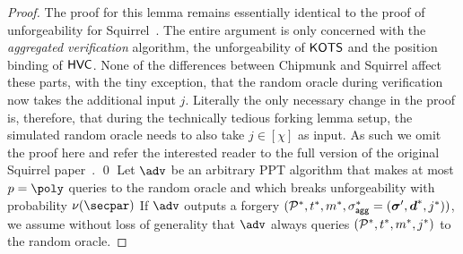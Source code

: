 \begin{proof}
  The proof for this lemma remains essentially identical to the proof of unforgeability for Squirrel~\cite{CCS:FleSimZha22}.
  The entire argument is only concerned with the \emph{aggregated verification} algorithm, the unforgeability of $\mathsf{KOTS}$ and the position binding of $\mathsf{HVC}$.
  None of the differences between Chipmunk and Squirrel affect these parts, with the tiny exception, that the random oracle during verification now takes the additional input $j$.
  Literally the only necessary change in the proof is, therefore, that during the technically tedious forking lemma setup, the simulated random oracle needs to also take $j\in[\chi]$ as input.
  As such we omit the proof here and refer the interested reader to the full version of the original Squirrel paper~\cite{EPRINT:FleSimZha22}. \qed
  \iffalse
  Let $\adv$ be an arbitrary PPT algorithm that makes at most $p=\poly$ queries to the random oracle and which breaks unforgeability with probability $\nu(\secpar)$
  If $\adv$ outputs a forgery $(\mathcal{P}^*,t^*,m^*,\sigma_\mathsf{agg}^*=(\boldsymbol{\sigma}',\boldsymbol{d}^*,j^*))$, we assume without loss of generality that $\adv$ always queries $(\mathcal{P}^*,t^*,m^*,j^*)$ to the random oracle.
  

\end{proof}
